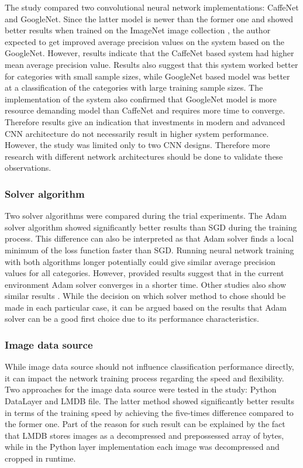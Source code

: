 The study compared two convolutional neural network implementations: CaffeNet and GoogleNet. Since the latter model is newer than the former one and showed better results when trained on the ImageNet image collection \cite{Szegedy2015GoingDeeper}, the author expected to get improved average precision values on the system based on the GoogleNet. However, results indicate that the CaffeNet based system had higher mean average precision value. Results also suggest that this system worked better for categories with small sample sizes, while GoogleNet based model was better at a classification of the categories with large training sample sizes. The implementation of the system also confirmed that GoogleNet model is more resource demanding model than CaffeNet and requires more time to converge. Therefore results give an indication that investments in modern and advanced CNN architecture do not necessarily result in higher system performance. However, the study was limited only to two CNN designs. Therefore more research with different network architectures should be done to validate these observations.


\subsubsection{Solver algorithm}
Two solver algorithms were compared during the trial experiments. The Adam solver algorithm showed significantly better results than SGD during the training process. This difference can also be interpreted as that Adam solver finds a local minimum of the loss function faster than SGD. Running neural network training with both algorithms longer potentially could give similar average precision values for all categories. However, provided results suggest that in the current environment Adam solver converges in a shorter time. Other studies also show similar results \cite{adam}. While the decision on which solver method to chose should be made in each particular case, it can be argued based on the results that Adam solver can be a good first choice due to its performance characteristics.

\subsubsection{Image data source}
While image data source should not influence classification performance directly, it can impact the network training process regarding the speed and flexibility. Two approaches for the image data source were tested in the study: Python DataLayer and LMDB file. The latter method showed significantly better results in terms of the training speed by achieving the five-times difference compared to the former one. Part of the reason for such result can be explained by the fact that LMDB stores images as a decompressed and prepossessed array of bytes, while in the Python layer implementation each image was decompressed and cropped in runtime.

